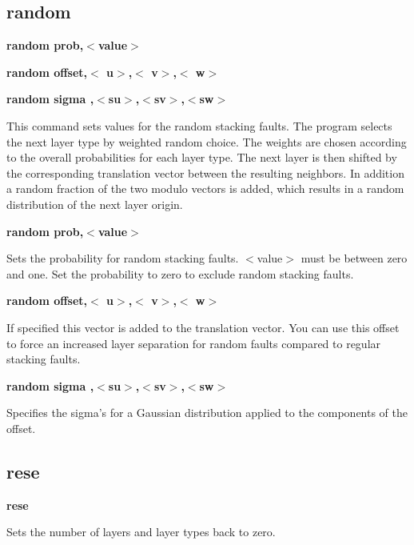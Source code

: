 \subsection*{random}
{\bf random prob,$ <$value$> $ \par }
{\bf random offset,$ <$ u$> $,$ <$ v$> $,$ <$ w$> $ \par }
{\bf random sigma ,$ <$su$> $,$ <$sv$> $,$ <$sw$> $ \par }
\par
\vspace{3pt}
This command sets values for the random stacking faults. The program 
selects the next layer type by weighted random choice. The weights 
are chosen according to the overall probabilities for each layer type. 
The next layer is then shifted by the corresponding translation vector 
between the resulting neighbors. In addition a random fraction of the 
two modulo vectors is added, which results in a random distribution 
of the next layer origin. 
\par
{\bf random prob,$ <$value$> $ \par }
\vspace{3pt}
Sets the probability for random stacking faults. $ <$value$> $ must be between 
zero and one. Set the probability to zero to exclude random stacking 
faults. 
\par
{\bf random offset,$ <$ u$> $,$ <$ v$> $,$ <$ w$> $ \par }
\vspace{3pt}
If specified this vector is added to the translation vector. You can 
use this offset to force an increased layer separation for random 
faults compared to regular stacking faults. 
\par
{\bf random sigma ,$ <$su$> $,$ <$sv$> $,$ <$sw$> $ \par }
\vspace{3pt}
Specifies the sigma's for a Gaussian distribution applied to the 
components of the offset. 
\subsection*{rese}
{\bf rese \par }
\par
\vspace{3pt}
Sets the number of layers and layer types back to zero. 
